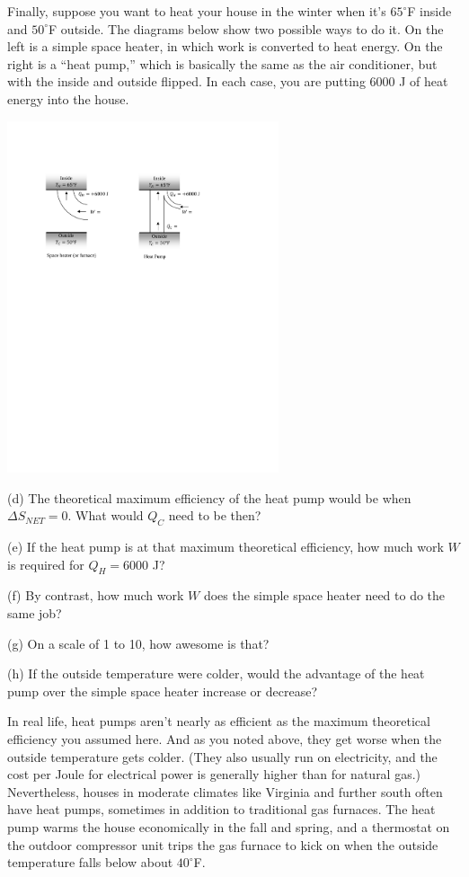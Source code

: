 \pagebreak[2]
Finally, suppose you want to heat your house in the winter when it's $65^\circ$F inside and $50^\circ$F outside.  The diagrams below show two possible ways to do it.  On the left is a simple space heater, in which work is converted to heat energy.  On the right is a ``heat pump,'' which is basically the same as the air conditioner, but with the inside and outside flipped.  In each case, you are putting 6000 J of heat energy into the house.

\begin{center}
\vspace{-0.2 in}
\includegraphics[width=0.6\textwidth]{entropy_is_it_possible/fig7.pdf}
\vspace{-0.1 in}
\end{center}

(d) The theoretical maximum efficiency of the heat pump would be when $\Delta S_{NET}=0$.  What would $Q_C$ need to be then?
\answerspace{1.2 in}

(e) If the heat pump is at that maximum theoretical efficiency, how much work $W$ is required for $Q_H = 6000$ J?
 \answerspace{0.6 in}

(f) By contrast, how much work $W$ does the simple space heater need to do the same job? 
\answerspace{0.4 in}

(g) On a scale of 1 to 10, how awesome is that?
\answerspace{0.4 in}

(h) If the outside temperature were colder, would the advantage of the heat pump over the simple space heater increase or decrease? 
\answerspace{0.4 in}

In real life, heat pumps aren't nearly as efficient as the maximum theoretical efficiency you assumed here.  And as you noted above, they get worse when the outside temperature gets colder.  (They also usually run on electricity, and the cost per Joule for electrical power is generally higher than for natural gas.)  Nevertheless, houses in moderate climates like Virginia and further south often have heat pumps, sometimes in addition to traditional gas furnaces.  The heat pump warms the house economically in the fall and spring, and a thermostat on the outdoor compressor unit trips the gas furnace to kick on when the outside temperature falls below about $40^\circ$F.

